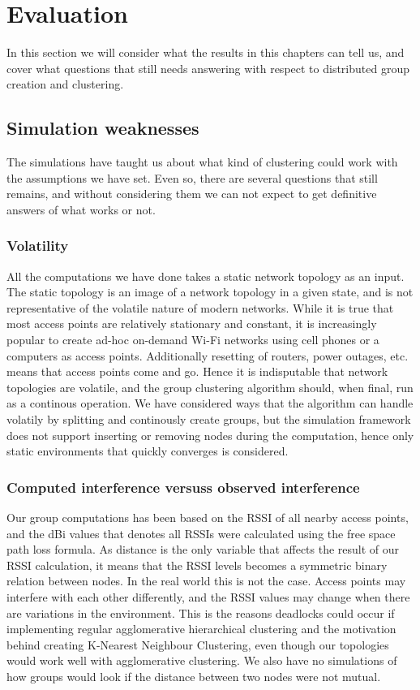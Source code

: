 \section{Evaluation}
In this section we will consider what the results in this chapters can tell us, and cover what questions that still needs answering with respect to distributed group creation and clustering.  
\subsection{Simulation weaknesses}
The simulations have taught us about what kind of clustering could work with the assumptions we have set. Even so, there are several questions that still remains,
and without considering them we can not expect to get definitive answers of what works or not. 

\subsubsection{Volatility} 
All the computations we have done takes a static network topology as an input. The static topology is an image of a network topology in a given state, and is not representative
of the volatile nature of modern networks. While it is true that most access points are relatively stationary and constant, it is increasingly popular to create
ad-hoc on-demand Wi-Fi networks using cell phones or a computers as access points. Additionally resetting of routers, power outages, etc. means that access points come and go. 
Hence it is indisputable that network topologies are volatile, and the group clustering algorithm should, when final, run as a continous operation. We have considered ways that 
the algorithm can handle volatily by splitting and continously create groups, but the simulation framework does not support inserting or removing nodes during the computation, hence
only static environments that quickly converges is considered. 

\subsubsection{Computed interference versuss observed interference}
Our group computations has been based on the RSSI of all nearby access points, and the dBi values that denotes all RSSIs were calculated using the free space path loss formula.
As distance is the only variable that affects the result of our RSSI calculation, it means that the RSSI levels becomes a symmetric binary relation between nodes. In the real world 
this is not the case. Access points may interfere with each other differently, and the RSSI values may change when there are variations in the environment. This is the reasons deadlocks could
occur if implementing regular agglomerative hierarchical clustering and the motivation behind creating K-Nearest Neighbour Clustering, even though our topologies would work well with agglomerative
clustering. We also have no simulations of how groups would look if the distance between two nodes were not mutual.

